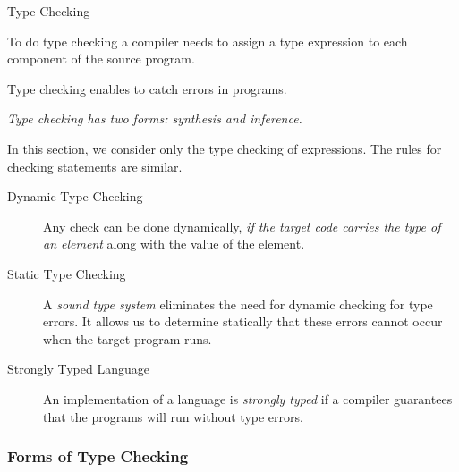 \begin{bibunit}[apalike]
\begin{frame}[allowframebreaks]{Type Checking}
	\vspace{1em}
	\begin{description}
	\item To do type checking a compiler needs to assign a type expression to each component of the source program.
	\item Type checking enables to catch errors in programs.
	\item \emph{Type checking has two forms: synthesis and inference.}
	\vspace{1em}
	\item[Note] In this section, we consider only the type checking of expressions. The rules for checking statements are similar.
	\end{description}
	\framebreak
	\begin{description}
	\item[Dynamic Type Checking] Any check can be done dynamically, \emph{if the target code carries the type of an element} along with the value of the element.
	\vspace{.5em}
	\item[Static Type Checking] A \emph{sound type system} eliminates the need for dynamic checking for type errors. It allows us to determine statically that these errors cannot occur when the target program runs.
	\vspace{.5em}
	\item[Strongly Typed Language] An implementation of a language is \emph{strongly typed} if a compiler guarantees that the programs will run without type errors.
	\end{description}
	\vspace{.5em}
\end{frame}

\subsubsection{Forms of Type Checking}

\tableofcontentslide[sections={3-6},sectionstyle={show/shaded},subsectionstyle={show/shaded/hide},subsubsectionstyle={show/shaded/hide/hide}]


\end{bibunit}
